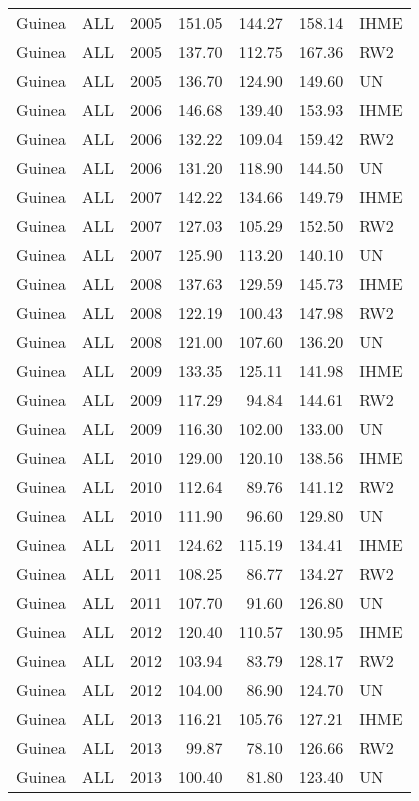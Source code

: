 \begin{longtable}{lllrrrl}
  Guinea & ALL & 2005 & 151.05 & 144.27 & 158.14 & IHME \\ 
  Guinea & ALL & 2005 & 137.70 & 112.75 & 167.36 & RW2 \\ 
  Guinea & ALL & 2005 & 136.70 & 124.90 & 149.60 & UN \\ 
  Guinea & ALL & 2006 & 146.68 & 139.40 & 153.93 & IHME \\ 
  Guinea & ALL & 2006 & 132.22 & 109.04 & 159.42 & RW2 \\ 
  Guinea & ALL & 2006 & 131.20 & 118.90 & 144.50 & UN \\ 
  Guinea & ALL & 2007 & 142.22 & 134.66 & 149.79 & IHME \\ 
  Guinea & ALL & 2007 & 127.03 & 105.29 & 152.50 & RW2 \\ 
  Guinea & ALL & 2007 & 125.90 & 113.20 & 140.10 & UN \\ 
  Guinea & ALL & 2008 & 137.63 & 129.59 & 145.73 & IHME \\ 
  Guinea & ALL & 2008 & 122.19 & 100.43 & 147.98 & RW2 \\ 
  Guinea & ALL & 2008 & 121.00 & 107.60 & 136.20 & UN \\ 
  Guinea & ALL & 2009 & 133.35 & 125.11 & 141.98 & IHME \\ 
  Guinea & ALL & 2009 & 117.29 & 94.84 & 144.61 & RW2 \\ 
  Guinea & ALL & 2009 & 116.30 & 102.00 & 133.00 & UN \\ 
  Guinea & ALL & 2010 & 129.00 & 120.10 & 138.56 & IHME \\ 
  Guinea & ALL & 2010 & 112.64 & 89.76 & 141.12 & RW2 \\ 
  Guinea & ALL & 2010 & 111.90 & 96.60 & 129.80 & UN \\ 
  Guinea & ALL & 2011 & 124.62 & 115.19 & 134.41 & IHME \\ 
  Guinea & ALL & 2011 & 108.25 & 86.77 & 134.27 & RW2 \\ 
  Guinea & ALL & 2011 & 107.70 & 91.60 & 126.80 & UN \\ 
  Guinea & ALL & 2012 & 120.40 & 110.57 & 130.95 & IHME \\ 
  Guinea & ALL & 2012 & 103.94 & 83.79 & 128.17 & RW2 \\ 
  Guinea & ALL & 2012 & 104.00 & 86.90 & 124.70 & UN \\ 
  Guinea & ALL & 2013 & 116.21 & 105.76 & 127.21 & IHME \\ 
  Guinea & ALL & 2013 & 99.87 & 78.10 & 126.66 & RW2 \\ 
  Guinea & ALL & 2013 & 100.40 & 81.80 & 123.40 & UN \\ 

\end{longtable}
